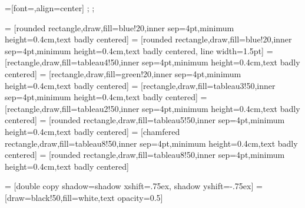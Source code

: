 



=[font=\scriptsize\sffamily,align=center]
\def\boxheight{0.4cm};
\def\isep{4pt};

 = [rounded rectangle,draw,fill=blue!20,inner sep=\isep,minimum height=\boxheight,text badly centered]
 = [rounded rectangle,draw,fill=blue!20,inner sep=\isep,minimum height=\boxheight,text badly centered, line width=1.5pt]
 = [rectangle,draw,fill=tableau4!50,inner sep=\isep,minimum height=\boxheight,text badly centered]
 = [rectangle,draw,fill=green!20,inner sep=\isep,minimum height=\boxheight,text badly centered]
 = [rectangle,draw,fill=tableau3!50,inner sep=\isep,minimum height=\boxheight,text badly centered]
 = [rectangle,draw,fill=tableau2!50,inner sep=\isep,minimum height=\boxheight,text badly centered]
 = [rounded rectangle,draw,fill=tableau5!50,inner sep=\isep,minimum height=\boxheight,text badly centered]
 = [chamfered rectangle,draw,fill=tableau8!50,inner sep=\isep,minimum height=\boxheight,text badly centered]
 = [rounded rectangle,draw,fill=tableau8!50,inner sep=\isep,minimum height=\boxheight,text badly centered]


 = [double copy shadow={shadow xshift=.75ex, shadow yshift=-.75ex}]
 = [draw=black!50,fill=white,text opacity=0.5]

